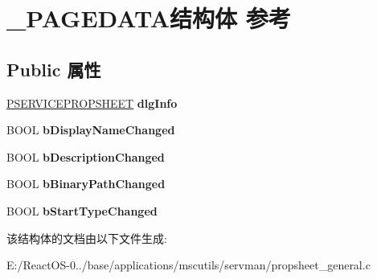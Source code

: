 \hypertarget{struct___p_a_g_e_d_a_t_a}{}\section{\+\_\+\+P\+A\+G\+E\+D\+A\+T\+A结构体 参考}
\label{struct___p_a_g_e_d_a_t_a}
\subsection*{Public 属性}
\begin{DoxyCompactItemize}
\item 
\mbox{\label{struct___p_a_g_e_d_a_t_a_a0f9dd00d0cb5c20ecb414b9a6b765eee}} 
\hyperlink{struct___s_e_r_v_i_c_e_p_r_o_p_s_h_e_e_t}{P\+S\+E\+R\+V\+I\+C\+E\+P\+R\+O\+P\+S\+H\+E\+ET} {\bfseries dlg\+Info}
\item 
\mbox{\label{struct___p_a_g_e_d_a_t_a_a7b0704e2253c55b5db4100c350b4ce09}} 
B\+O\+OL {\bfseries b\+Display\+Name\+Changed}
\item 
\mbox{\label{struct___p_a_g_e_d_a_t_a_a3afed56b90bd4734a5aefbd48d7aaf43}} 
B\+O\+OL {\bfseries b\+Description\+Changed}
\item 
\mbox{\label{struct___p_a_g_e_d_a_t_a_af4981b805133b3edf07417fd4c17e7e5}} 
B\+O\+OL {\bfseries b\+Binary\+Path\+Changed}
\item 
\mbox{\label{struct___p_a_g_e_d_a_t_a_aad57c0f1b07124fe458bafde694b5f37}} 
B\+O\+OL {\bfseries b\+Start\+Type\+Changed}
\end{DoxyCompactItemize}


该结构体的文档由以下文件生成\+:\begin{DoxyCompactItemize}
\item 
E\+:/\+React\+O\+S-\/0../base/applications/mscutils/servman/propsheet\+\_\+general.\+c\end{DoxyCompactItemize}
